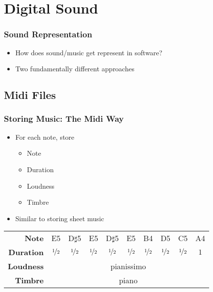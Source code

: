 \section{Digital Sound}

\frame{\tableofcontents[currentsection]}

\begin{frame}
  \frametitle{Sound Representation}
  \begin{itemize}
    \item How does sound/music get represent in software?
    \item Two fundamentally different approaches
  \end{itemize}
\end{frame}


\subsection{Midi Files}

\frame{\tableofcontents[currentsubsection]}


\begin{frame}
  \frametitle{Storing Music: The Midi Way}
  \begin{itemize}
    \item For each note, store
          \begin{itemize}
            \item Note
            \item Duration
            \item Loudness
            \item Timbre
          \end{itemize}
    \item Similar to storing sheet music
  \end{itemize}
  \vskip5mm
  \begin{center}
    \begin{tabular}{rccccccccc}
      \textbf{Note} & E5 & D$\sharp$5 & E5 & D$\sharp$5 & E5 & B4 & D5 & C5 & A4 \\
      \textbf{Duration} & $\nicefrac12$ & $\nicefrac12$ & $\nicefrac12$ & $\nicefrac12$ & $\nicefrac12$ & $\nicefrac12$ & $\nicefrac12$ & $\nicefrac12$ & $1$ \\
      \textbf{Loudness} & \multicolumn{9}{c}{pianissimo} \\
      \textbf{Timbre} & \multicolumn{9}{c}{piano} \\
    \end{tabular}
  \end{center}
\end{frame}

